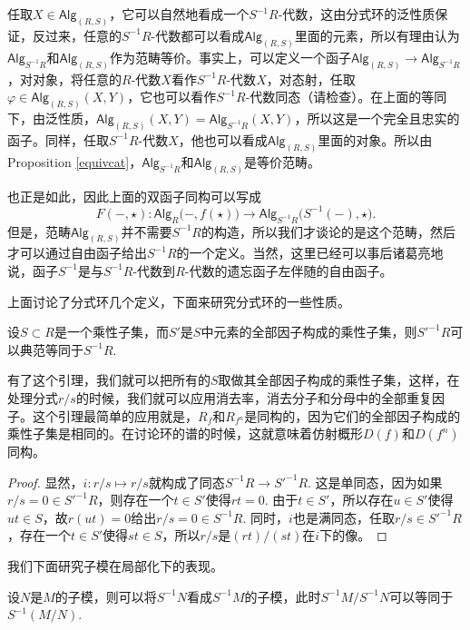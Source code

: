 任取$X\in \mathsf{Alg}_{(R,S)}$，它可以自然地看成一个$S^{-1}R$-代数，这由分式环的泛性质保证，反过来，任意的$S^{-1}R$-代数都可以看成$\mathsf{Alg}_{(R,S)}$里面的元素，所以有理由认为$\mathsf{Alg}_{S^{-1}R}$和$\mathsf{Alg}_{(R,S)}$作为范畴等价。事实上，可以定义一个函子$\mathsf{Alg}_{(R,S)}\to \mathsf{Alg}_{S^{-1}R}$，对对象，将任意的$R$-代数$X$看作$S^{-1}R$-代数$X$，对态射，任取$\varphi\in \mathsf{Alg}_{(R,S)}(X,Y)$，它也可以看作$S^{-1}R$-代数同态（请检查）。在上面的等同下，由泛性质，$\mathsf{Alg}_{(R,S)}(X,Y)=\mathsf{Alg}_{S^{-1}R}(X,Y)$，所以这是一个完全且忠实的函子。同样，任取$S^{-1}R$-代数$X$，他也可以看成$\mathsf{Alg}_{(R,S)}$里面的对象。所以由Proposition \ref{equivcat}，$\mathsf{Alg}_{S^{-1}R}$和$\mathsf{Alg}_{(R,S)}$是等价范畴。

也正是如此，因此上面的双函子同构可以写成
\[
	F(-,\star):\mathsf{Alg}_R\bigl(-,f(\star)\bigr)\to \mathsf{Alg}_{S^{-1}R}\bigl(S^{-1}(-),\star\bigr).
\]
但是，范畴$\mathsf{Alg}_{(R,S)}$并不需要$S^{-1}R$的构造，所以我们才谈论的是这个范畴，然后才可以通过自由函子给出$S^{-1}R$的一个定义。当然，这里已经可以事后诸葛亮地说，函子$S^{-1}$是与$S^{-1}R$-代数到$R$-代数的遗忘函子左伴随的自由函子。\endpara

上面讨论了分式环几个定义，下面来研究分式环的一些性质。

\begin{lem}
	设$S\subset R$是一个乘性子集，而$S'$是$S$中元素的全部因子构成的乘性子集，则$S'^{-1}R$可以典范等同于$S^{-1}R$.
\end{lem}

有了这个引理，我们就可以把所有的$S$取做其全部因子构成的乘性子集，这样，在处理分式$r/s$的时候，我们就可以应用消去率，消去分子和分母中的全部重复因子。这个引理最简单的应用就是，$R_f$和$R_{f^n}$是同构的，因为它们的全部因子构成的乘性子集是相同的。在讨论环的谱的时候，这就意味着仿射概形$D(f)$和$D(f^n)$同构。

\begin{proof}
	显然，$i:r/s\mapsto r/s$就构成了同态$S^{-1}R\to S'^{-1}R$. 这是单同态，因为如果$r/s=0\in S'^{-1}R$，则存在一个$t\in S'$使得$rt=0$. 由于$t\in S'$，所以存在$u\in S'$使得$ut\in S$，故$r(ut)=0$给出$r/s=0\in S^{-1}R$. 同时，$i$也是满同态，任取$r/s\in S'^{-1}R$，存在一个$t\in S'$使得$st\in S$，所以$r/s$是$(rt)/(st)$在$i$下的像。
\end{proof}

我们下面研究子模在局部化下的表现。

\begin{pro}
	设$N$是$M$的子模，则可以将$S^{-1}N$看成$S^{-1}M$的子模，此时$S^{-1}M/S^{-1}N$可以等同于$S^{-1}(M/N)$.
\end{pro}

